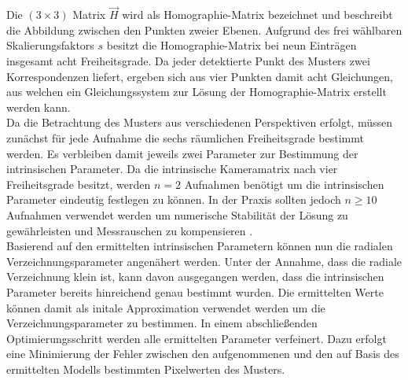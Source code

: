 Die $(3 \times 3)$ Matrix $\vec{H}$ wird als Homographie-Matrix bezeichnet und beschreibt die Abbildung zwischen den Punkten zweier Ebenen. Aufgrund des frei wählbaren Skalierungsfaktors $s$ besitzt die Homographie-Matrix bei neun Einträgen insgesamt acht Freiheitsgrade. Da jeder detektierte Punkt des Musters zwei Korrespondenzen liefert, ergeben sich aus vier Punkten damit acht Gleichungen, aus welchen ein Gleichungssystem zur Lösung der Homographie-Matrix erstellt werden kann.\\

Da die Betrachtung des Musters aus verschiedenen Perspektiven erfolgt, müssen zunächst für jede Aufnahme die sechs räumlichen Freiheitsgrade bestimmt werden. Es verbleiben damit jeweils zwei Parameter zur Bestimmung der intrinsischen Parameter. Da die intrinsische Kameramatrix nach  vier Freiheitsgrade besitzt, werden $n = 2$ Aufnahmen benötigt um die intrinsischen Parameter eindeutig festlegen zu können. In der Praxis sollten jedoch $n \geq 10$ Aufnahmen verwendet werden um numerische Stabilität der Lösung zu gewährleisten und Messrauschen zu kompensieren \cite{Bradsky2008}.\\


Basierend auf den ermittelten intrinsischen Parametern können nun die radialen Verzeichnungsparameter angenähert werden. Unter der Annahme, dass die radiale Verzeichnung klein ist, kann davon ausgegangen werden, dass die intrinsischen Parameter bereits hinreichend genau bestimmt wurden. Die ermittelten Werte können damit als initale Approximation verwendet werden um die Verzeichnungsparameter zu bestimmen. In einem abschließenden Optimierungsschritt werden alle ermittelten Parameter verfeinert. Dazu erfolgt eine Minimierung der Fehler zwischen den aufgenommenen und den auf Basis des ermittelten Modells bestimmten Pixelwerten des Musters.\\

